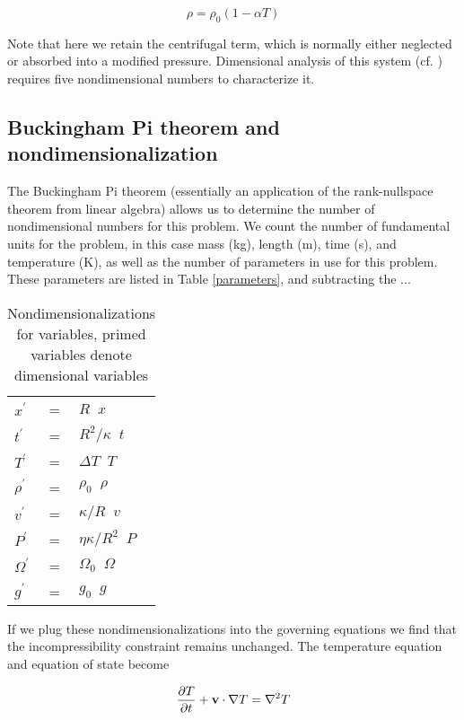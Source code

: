 \documentclass[extra]{gji}
\newif\ifdetail
\begin{document}
\begin{equation}
\rho = \rho_0 \left( 1 - \alpha T \right)
\label{eos}
\end{equation}

Note that here we retain the centrifugal term, which is normally either neglected or absorbed into a modified pressure. 
Dimensional analysis of this system (cf. \citet{barenblatt1996scaling}) requires five nondimensional numbers to characterize it.

\ifdetail
\subsection{Buckingham Pi theorem and nondimensionalization}
The Buckingham Pi theorem (essentially an application of the rank-nullspace theorem from linear algebra) allows us to determine the number of nondimensional numbers for this problem.  
We count the number of fundamental units for the problem, in this case mass (kg), length (m), time (s), and temperature (K), as well as the number of parameters in use for this problem.  
These parameters are listed in Table \ref{parameters}, and subtracting the ...

\begin{table}
\caption{Nondimensionalizations for variables, primed variables denote dimensional variables}
\label{nondim_convert}
\begin{tabular}{@{}lll}
$x^\prime$ &=& $R \;\; x$ \\
$t^\prime$ &=& $R^2/\kappa \;\; t$ \\
$T^\prime$ &=& $\Delta T \;\; T$ \\
$\rho^\prime$ &=& $\rho_0 \;\; \rho$\\
$v^\prime$ &=& $\kappa/R \;\; v$ \\
$P^\prime$ &=& $\eta \kappa/R^2 \;\; P$ \\
$\Omega^\prime$ &=& $\Omega_0 \;\; \Omega$ \\
$g^\prime$ &=& $g_0 \;\; g$
\end{tabular}
\end{table}

If we plug these nondimensionalizations into the governing equations we find that the incompressibility constraint remains unchanged.  The temperature equation and equation of state become

\begin{equation}
\frac{\partial T}{\partial t} + {\bf v} \cdot \nabla T = \nabla^2 T
\end{equation}
\end{document}
